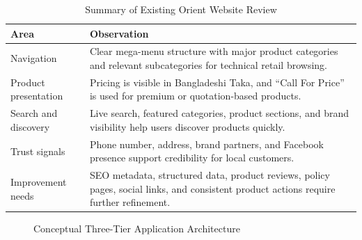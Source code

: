 \documentclass[12pt,a4paper,oneside]{report}
\begin{document}
\begin{table}[H]
\centering
\caption{Summary of Existing Orient Website Review}
\label{tab:existing_website_review}
\begin{tabularx}{\textwidth}{p{3.5cm}X}
\toprule
\textbf{Area} & \textbf{Observation} \\
\midrule
Navigation & Clear mega-menu structure with major product categories and relevant subcategories for technical retail browsing. \\
Product presentation & Pricing is visible in Bangladeshi Taka, and ``Call For Price'' is used for premium or quotation-based products. \\
Search and discovery & Live search, featured categories, product sections, and brand visibility help users discover products quickly. \\
Trust signals & Phone number, address, brand partners, and Facebook presence support credibility for local customers. \\
Improvement needs & SEO metadata, structured data, product reviews, policy pages, social links, and consistent product actions require further refinement. \\
\bottomrule
\end{tabularx}
\end{table}

\begin{figure}[H]
    \centering
    \caption{Conceptual Three-Tier Application Architecture}
    \label{fig:tech_landscape}
\end{figure}
\end{document}
